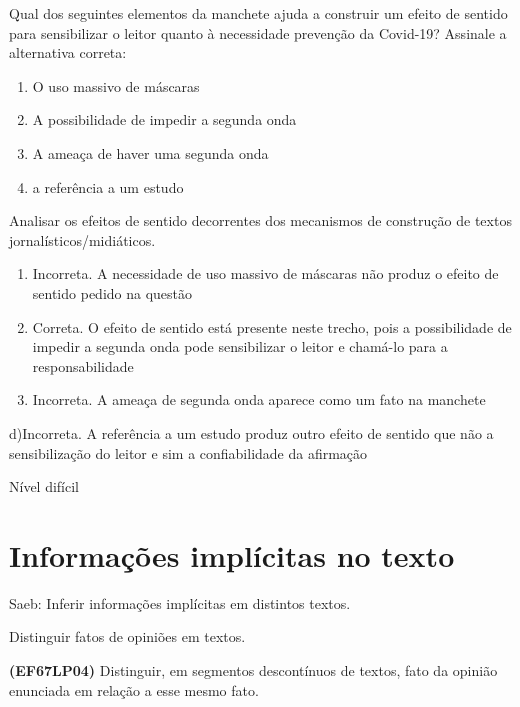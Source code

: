 {Qual dos seguintes elementos da manchete ajuda a construir um efeito de
sentido para sensibilizar o leitor quanto à necessidade prevenção da
Covid-19? Assinale a alternativa correta:

\begin{enumerate}
\def\labelenumi{\alph{enumi})}
\item
  O uso massivo de máscaras
\item
  A possibilidade de impedir a segunda onda
\item
  A ameaça de haver uma segunda onda
\item
  a referência a um estudo
\end{enumerate}

Analisar os efeitos de sentido decorrentes dos mecanismos de construção
de textos jornalísticos/midiáticos.

\begin{enumerate}
\def\labelenumi{\arabic{enumi}.}
\item
  Incorreta. A necessidade de uso massivo de máscaras não produz o
  efeito de sentido pedido na questão
\item
  Correta. O efeito de sentido está presente neste trecho, pois a
  possibilidade de impedir a segunda onda pode sensibilizar o leitor e
  chamá-lo para a responsabilidade
\item
  Incorreta. A ameaça de segunda onda aparece como um fato na manchete
\end{enumerate}

d)Incorreta. A referência a um estudo produz outro efeito de sentido que
não a sensibilização do leitor e sim a confiabilidade da afirmação

Nível difícil

\pagestyle{port}
\chapter{Informações implícitas no texto}

Saeb: Inferir informações implícitas em distintos textos.

Distinguir fatos de opiniões em textos.

\textbf{(EF67LP04)} Distinguir, em segmentos descontínuos de textos,
fato da opinião enunciada em relação a esse mesmo fato.

}
